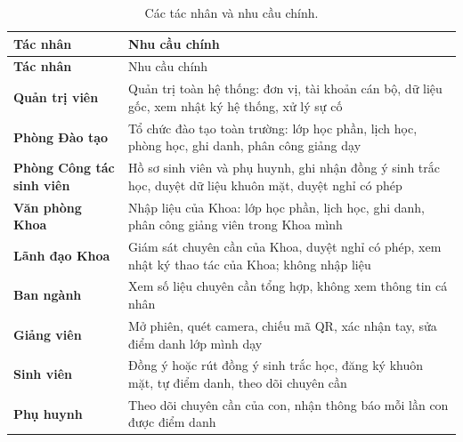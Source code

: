 {\small
\begin{xltabular}{\textwidth}{@{}>{\bfseries}p{3.4cm} X@{}}
\caption{Các tác nhân và nhu cầu chính.}
\label{tab:tacnhan}\\
\toprule
Tác nhân & Nhu cầu chính \\
\midrule
\endfirsthead
\toprule
Tác nhân & Nhu cầu chính \\
\midrule
\endhead
\bottomrule
\endfoot
Quản trị viên & Quản trị toàn hệ thống: đơn vị, tài khoản cán bộ, dữ liệu
  gốc, xem nhật ký hệ thống, xử lý sự cố \\
Phòng Đào tạo & Tổ chức đào tạo toàn trường: lớp học phần, lịch học, phòng
  học, ghi danh, phân công giảng dạy \\
Phòng Công tác sinh viên & Hồ sơ sinh viên và phụ huynh, ghi nhận đồng ý sinh
  trắc học, duyệt dữ liệu khuôn mặt, duyệt nghỉ có phép \\
Văn phòng Khoa & Nhập liệu của Khoa: lớp học phần, lịch học, ghi danh, phân
  công giảng viên trong Khoa mình \\
Lãnh đạo Khoa & Giám sát chuyên cần của Khoa, duyệt nghỉ có phép, xem nhật
  ký thao tác của Khoa; không nhập liệu \\
Ban ngành & Xem số liệu chuyên cần tổng hợp, không xem thông tin cá nhân \\
Giảng viên & Mở phiên, quét camera, chiếu mã QR, xác nhận tay, sửa điểm danh
  lớp mình dạy \\
Sinh viên & Đồng ý hoặc rút đồng ý sinh trắc học, đăng ký khuôn mặt, tự điểm
  danh, theo dõi chuyên cần \\
Phụ huynh & Theo dõi chuyên cần của con, nhận thông báo mỗi lần con được
  điểm danh \\
\end{xltabular}}

